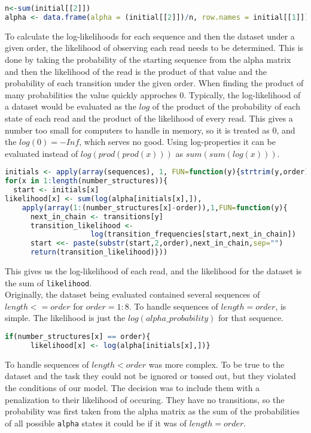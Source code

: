 \documentclass[12pt]{article}
\begin{document}
\begin{enumerate}[label = \textbf{\alph*.}]
\begin{lstlisting}[language=R]
n<-sum(initial[[2]])
alpha <- data.frame(alpha = (initial[[2]])/n, row.names = initial[[1]])
    \end{lstlisting}
    
    To calculate the log-likelihoods for each sequence and then the dataset under a given order, the likelihood of observing each read needs to be determined. This is done by taking the probability of the starting sequence from the alpha matrix and then the likelihood of the read is the product of that value and the probability of each transition under the given order. When finding the product of many probabilities the value quickly approches $0$. Typically, the log-likelihood of a dataset would be evaluated as the $log$ of the product of the probability of each state of each read and the product of the likelihood of every read. This gives a number too small for computers to handle in memory, so it is treated as $0$, and the $log(0) = -Inf$, which serves no good. Using log-properties it can be evaluated instead of $log(prod(prod(x)))$ as $sum(sum(log(x)))$.
    \begin{lstlisting}[language=R]
initials <- apply(array(sequences), 1, FUN=function(y){strtrim(y,order)})
for(x in 1:length(number_structures)){
  start <- initials[x]
likelihood[x] <- sum(log(alpha[initials[x],]),
    apply(array(1:(number_structures[x]-order)),1,FUN=function(y){
      next_in_chain <- transitions[y]
      transition_likelihood <- 
                    log(transition_frequencies[start,next_in_chain])
      start <<- paste(substr(start,2,order),next_in_chain,sep="")
      return(transition_likelihood)}))
    \end{lstlisting}
    This gives us the log-likelihood of each read, and the likelihood for the dataset is the sum of \texttt{likelihood}.\\
    Originally, the dataset being evaluated contained several sequences of $length <= order$ for $order = 1:8$. To handle sequences of $length = order$, is simple. The likelihood is just the $log(alpha\_probability)$ for that sequence.
    \begin{lstlisting}[language=R]
if(number_structures[x] == order){
      likelihood[x] <- log(alpha[initials[x],])}
    \end{lstlisting}
    To handle sequences of $length < order$ was more complex. To be true to the dataset and the task they could not be ignored or tossed out, but they violated the conditions of our model. The decision was to include them with a penalization to their likelihood of occuring. They have no transitions, so the probability was first taken from the alpha matrix as the sum of the probabilities of all possible \texttt{alpha} states it could be if it was of $length = order$.

\end{enumerate}
\end{document}
